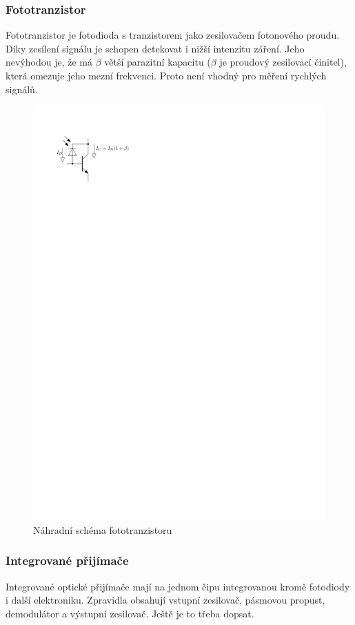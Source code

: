 \subsubsection{Fototranzistor}
Fototranzistor je fotodioda s tranzistorem jako zesilovačem fotonového proudu. Díky zesílení signálu je schopen detekovat i nižší intenzitu záření. Jeho nevýhodou je, že má $\beta$ větší parazitní kapacitu ($\beta$ je proudový zesilovací činitel), která omezuje jeho mezní frekvenci. Proto není vhodný pro měření rychlých signálů.

\begin{figure}[H]
    \begin{center}
        \includegraphics[scale=1]{img/foto-tran}
    \end{center}
    \caption{Náhradní schéma fototranzistoru}
\end{figure}

\subsubsection{Integrované přijímače}
Integrované optické přijímače mají na jednom čipu integrovanou kromě fotodiody i další elektroniku. Zpravidla obsahují vstupní zesilovač, pásmovou propust, demodulátor a výstupní zesilovač. Ještě je to třeba dopsat.
